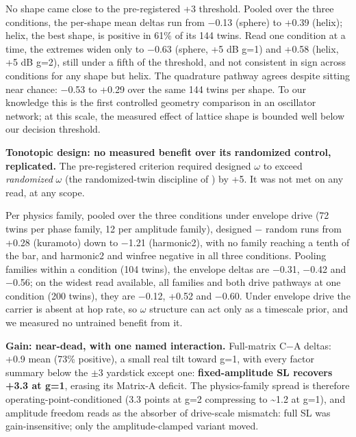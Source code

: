 \documentclass[10pt]{article}
\begin{document}
No shape came close to the pre-registered +3 threshold. Pooled over the
three conditions, the per-shape mean deltas run from \ensuremath{-}0.13
(sphere) to +0.39 (helix); helix, the best shape, is positive in 61\% of
its 144 twins. Read one condition at a time, the extremes widen only to
\ensuremath{-}0.63 (sphere, +5 dB g=1) and +0.58 (helix, +5 dB g=2),
still under a fifth of the threshold, and not consistent in sign across
conditions for any shape but helix. The quadrature pathway agrees
despite sitting near chance: \ensuremath{-}0.53 to +0.29 over the same
144 twins per shape. To our knowledge this is the first controlled
geometry comparison in an oscillator network; at this scale, the
measured effect of lattice shape is bounded well below our decision
threshold.

\textbf{Tonotopic design: no measured benefit over its randomized
control, replicated.} The pre-registered criterion required designed
\ensuremath{\omega} to exceed \emph{randomized} \ensuremath{\omega} (the
randomized-twin discipline of \citep{caranzano}) by +5. It was not met
on any read, at any scope.

Per physics family, pooled over the three conditions under envelope
drive (72 twins per phase family, 12 per amplitude family), designed
\ensuremath{-} random runs from +0.28 (kuramoto) down to
\ensuremath{-}1.21 (harmonic2), with no family reaching a tenth of the
bar, and harmonic2 and winfree negative in all three conditions. Pooling
families within a condition (104 twins), the envelope deltas are
\ensuremath{-}0.31, \ensuremath{-}0.42 and \ensuremath{-}0.56; on the
widest read available, all families and both drive pathways at one
condition (200 twins), they are \ensuremath{-}0.12, +0.52 and
\ensuremath{-}0.60. Under envelope drive the carrier is absent at hop
rate, so \ensuremath{\omega} structure can act only as a timescale
prior, and we measured no untrained benefit from it.

\textbf{Gain: near-dead, with one named interaction.} Full-matrix
C\ensuremath{-}A deltas: +0.9 mean (73\% positive), a small real tilt
toward g=1, with every factor summary below the \ensuremath{\pm}3
yardstick except one: \textbf{fixed-amplitude SL recovers +3.3 at g=1},
erasing its Matrix-A deficit. The physics-family spread is therefore
operating-point-conditioned (3.3 points at g=2 compressing to
\textasciitilde1.2 at g=1), and amplitude freedom reads as the absorber
of drive-scale mismatch: full SL was gain-insensitive; only the
amplitude-clamped variant moved.
\end{document}
